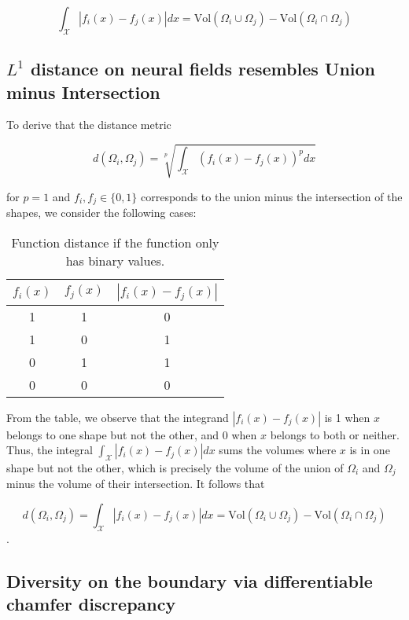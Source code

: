 \begin{equation}
    \int_\mathcal{X} |f_i(x) - f_j(x)| dx = \text{Vol}(\Omega_i \cup \Omega_j) - \text{Vol}(\Omega_i \cap \Omega_j)
\end{equation}


\subsection{$L^1$ distance on neural fields resembles Union minus Intersection}
To derive that the distance metric 

\begin{equation}
     d(\Omega_i, \Omega_j) = \sqrt[p]{\int_\mathcal{X} (f_i(x) - f_j(x))^p dx}
\end{equation}

for \( p=1 \) and \( f_i, f_j \in \{0,1\} \) corresponds to the union minus the intersection of the shapes, we consider the following cases:

\begin{table}[h!]
    \centering
    \begin{tabular}{c|c|c}
    \( f_i(x) \) & \( f_j(x) \) & \( |f_i(x) - f_j(x)| \) \\
    \hline
    1 & 1 & 0 \\
    1 & 0 & 1 \\
    0 & 1 & 1 \\
    0 & 0 & 0 \\
    \end{tabular}
    \caption{Function distance if the function only has binary values.}
    \label{tab:binary}
\end{table}


From the table, we observe that the integrand \( |f_i(x) - f_j(x)| \) is 1 when \( x \) belongs to one shape but not the other, and 0 when \( x \) belongs to both or neither.
Thus, the integral \( \int_\mathcal{X} |f_i(x) - f_j(x)| dx \) sums the volumes where \( x \) is in one shape but not the other, which is precisely the volume of the union of \( \Omega_i \) and \( \Omega_j \) minus the volume of their intersection.
It follows that 

\begin{equation}
    d(\Omega_i, \Omega_j) = \int_\mathcal{X} |f_i(x) - f_j(x)| dx = \text{Vol}(\Omega_i \cup \Omega_j) - \text{Vol}(\Omega_i \cap \Omega_j) 
\end{equation}.


\subsection{Diversity on the boundary via differentiable chamfer discrepancy}
\label{subsec:chamfer_diversity}

